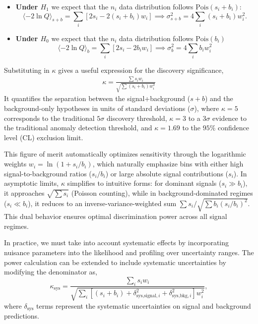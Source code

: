 \begin{itemize}
	\item \textbf{Under $H_1$} we expect that the $n_i$ data distribution follows $\text{Pois}(s_i + b_i)$:
	\begin{equation}
	\langle -2\ln Q \rangle_{s+b} = \sum_i \left[2s_i - 2(s_i + b_i)w_i\right]
	\implies \sigma^2_{s+b} = 4\sum_i (s_i + b_i) w_i^2.
	\end{equation}

	\item \textbf{Under $H_0$} we expect that the $n_i$ data distribution follows $\text{Pois}(b_i)$
	\begin{equation}
	\langle -2\ln Q \rangle_{b} = \sum_i \left[2s_i - 2b_i w_i\right]
	\implies \sigma^2_{b} = 4\sum_i b_i w_i^2
	\end{equation}
\end{itemize}
Substituting in $\kappa$ gives a useful expression for the discovery significance,
\begin{align}
\kappa = \frac{\sum s_i w_i}{\sqrt{\sum (s_i + b_i) w_i^2}}
\end{align}
It quantifies the separation between the signal+background ($s+b$) and the background-only hypotheses in units of standard deviations ($\sigma$), where $\kappa = 5$ corresponds to the traditional $5\sigma$ discovery threshold, $\kappa =3$ to a $3\sigma$ evidence to the traditional anomaly detection threshold, and $\kappa = 1.69$ to the $95\%$ confidence level (CL) exclusion limit.


This figure of merit automatically optimizes sensitivity through the logarithmic weights $w_i = \ln(1 + s_i/b_i)$, which naturally emphasize bins with either high signal-to-background ratios ($s_i/b_i$) or large absolute signal contributions ($s_i$). In asymptotic limits, $\kappa$ simplifies to intuitive forms: for dominant signals ($s_i \gg b_i$), it approaches $\sqrt{\sum s_i}$ (Poisson counting), while in background-dominated regimes ($s_i \ll b_i$), it reduces to an inverse-variance-weighted sum $\sum s_i / \sqrt{\sum b_i (s_i/b_i)^2}$. This dual behavior ensures optimal discrimination power across all signal regimes.

In practice, we must take into account systematic effects by incorporating nuisance parameters into the likelihood and profiling over uncertainty ranges. The power calculation can be extended to include systematic uncertainties by modifying the denominator as,
\begin{equation}
	\boxed{
	\kappa_{\text{sys}} = \frac{\sum_i s_i w_i}{\sqrt{\sum_i \left[(s_i + b_i) + \delta^2_{\text{sys,signal},i} + \delta^2_{\text{sys,bkg},i}\right] w_i^2}},
}
\label{eq:kappa_with_systematics}
\end{equation}
where $\delta_{\text{sys}}$ terms represent the systematic uncertainties on signal and background predictions.

